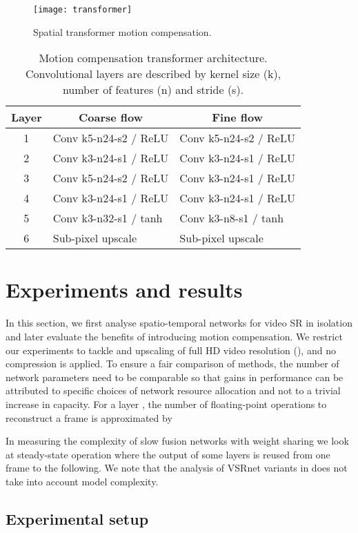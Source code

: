 \documentclass[10pt,twocolumn,letterpaper]{article}
\begin{document}
\begin{figure}[t]
  \centering
    \texttt{[image: transformer]}
  \caption{Spatial transformer motion compensation.}
  \label{fig:transformer}
\end{figure}
\begin{table}[tb]
\footnotesize
\begin{tabular}{c|l|l}
Layer & \multicolumn{1}{c|}{Coarse flow} & \multicolumn{1}{c}{Fine flow} \\ \hline
1   & Conv k5-n24-s2 / ReLU & Conv k5-n24-s2 / ReLU \\
2   & Conv k3-n24-s1 / ReLU & Conv k3-n24-s1 / ReLU \\
3   & Conv k5-n24-s2 / ReLU & Conv k3-n24-s1 / ReLU \\
4   & Conv k3-n24-s1 / ReLU & Conv k3-n24-s1 / ReLU \\
5   & Conv k3-n32-s1 / tanh & Conv k3-n8-s1 / tanh \\
6   & Sub-pixel upscale  & Sub-pixel upscale 
\end{tabular}
\caption{Motion compensation transformer architecture. Convolutional layers are described by kernel size (k), number of features (n) and stride (s).}
\label{tab:transformer}
\end{table}

\section{Experiments and results}

In this section, we first analyse spatio-temporal networks for video \gls{SR} in isolation and later evaluate the benefits of introducing motion compensation. We restrict our experiments to tackle  and  upscaling of full \gls{HD} video resolution (), and no compression is applied. To ensure a fair comparison of methods, the number of network parameters need to be comparable so that gains in performance can be attributed to specific choices of network resource allocation and not to a trivial increase in capacity. For a layer , the number of floating-point operations to reconstruct a frame is approximated by 

In measuring the complexity of slow fusion networks with weight sharing we look at steady-state operation where the output of some layers is reused from one frame to the following. We note that the analysis of VSRnet variants in \cite{Kappeler2016} does not take into account model complexity.

\subsection{Experimental setup}
\end{document}
